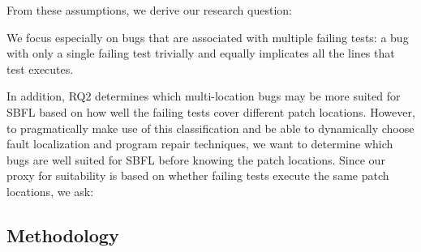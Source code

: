 \documentclass[10pt, conference]{IEEEtran}
\begin{document}




From these assumptions, we derive our research question: 


We focus especially on bugs that are associated with multiple failing tests: a bug
with only a single failing test trivially and equally implicates all the lines
that test executes. 


In addition, RQ2 determines which multi-location bugs may be more suited for SBFL 
based on how well the failing tests cover different patch locations. However, to pragmatically 
make use of this classification and be able to dynamically choose fault localization and program 
repair techniques, we want to determine which bugs are well suited for SBFL before knowing 
the patch locations. Since our proxy for suitability is based on whether failing tests execute 
the same patch locations, we ask:


\subsection{Methodology}
\end{document}
